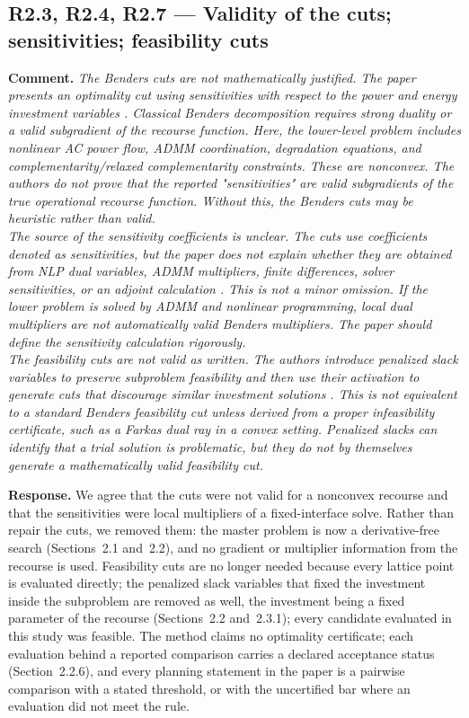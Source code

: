 \documentclass[11pt]{article}
\newcommand{\rcomment}[1]{\par\medskip\noindent\textbf{Comment.} \textit{#1}\par\smallskip}
\newcommand{\rresponse}[1]{\noindent\textbf{Response.} #1\par\smallskip}
\begin{document}
\subsection*{R2.3, R2.4, R2.7 --- Validity of the cuts; sensitivities; feasibility cuts}
\rcomment{
The Benders cuts are not mathematically justified. The paper presents an optimality cut using sensitivities with respect to the power and energy investment variables . Classical Benders decomposition requires strong duality or a valid subgradient of the recourse function. Here, the lower-level problem includes nonlinear AC power flow, ADMM coordination, degradation equations, and complementarity/relaxed complementarity constraints. These are nonconvex. The authors do not prove that the reported "sensitivities" are valid subgradients of the true operational recourse function. Without this, the Benders cuts may be heuristic rather than valid.\\
The source of the sensitivity coefficients is unclear. The cuts use coefficients denoted as sensitivities, but the paper does not explain whether they are obtained from NLP dual variables, ADMM multipliers, finite differences, solver sensitivities, or an adjoint calculation . This is not a minor omission. If the lower problem is solved by ADMM and nonlinear programming, local dual multipliers are not automatically valid Benders multipliers. The paper should define the sensitivity calculation rigorously.\\
The feasibility cuts are not valid as written. The authors introduce penalized slack variables to preserve subproblem feasibility and then use their activation to generate cuts that discourage similar investment solutions . This is not equivalent to a standard Benders feasibility cut unless derived from a proper infeasibility certificate, such as a Farkas dual ray in a convex setting. Penalized slacks can identify that a trial solution is problematic, but they do not by themselves generate a mathematically valid feasibility cut.
}
\rresponse{
    We agree that the cuts were not valid for a nonconvex recourse and that the sensitivities were local multipliers of a fixed-interface solve. Rather than repair the cuts, we removed them: the master problem is now a derivative-free search (Sections~2.1 and~2.2), and no gradient or multiplier information from the recourse is used. Feasibility cuts are no longer needed because every lattice point is evaluated directly; 
    the penalized slack variables that fixed the investment inside the subproblem are removed as well, the investment being a fixed parameter of the recourse (Sections~2.2 and~2.3.1);
    every candidate evaluated in this study was feasible. The method claims no optimality certificate; each evaluation behind a reported comparison carries a declared acceptance status (Section~2.2.6), and every planning statement in the paper is a pairwise comparison with a stated threshold, or with the uncertified bar where an evaluation did not meet the rule.
}
\end{document}
